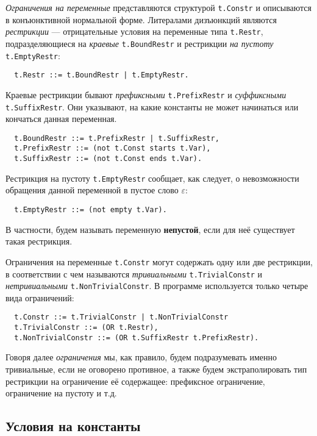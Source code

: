 \documentclass[12pt]{article}
\begin{document}
\textit{Ограничения на переменные} представляются структурой \texttt{t.Constr}
и описываются в конъюнктивной нормальной форме. Литералами дизъюнкций являются
\textit{рестрикции} --- отрицательные условия на переменные типа
\texttt{t.Restr}, подразделяющиеся на \textit{краевые} \texttt{t.BoundRestr} и
рестрикции \textit{на пустоту} \\ \texttt{t.EmptyRestr}:
\begin{Verbatim}
  t.Restr ::= t.BoundRestr | t.EmptyRestr.
\end{Verbatim}
Краевые рестрикции бывают \textit{префиксными} \texttt{t.PrefixRestr} и
\textit{суффиксными} \texttt{t.SuffixRestr}. Они указывают, на какие константы
не может начинаться или кончаться данная переменная.
\begin{Verbatim}
  t.BoundRestr ::= t.PrefixRestr | t.SuffixRestr,
  t.PrefixRestr ::= (not t.Const starts t.Var),
  t.SuffixRestr ::= (not t.Const ends t.Var).
\end{Verbatim}
Рестрикция на пустоту \texttt{t.EmptyRestr} сообщает, как следует, о
невозможности обращения данной переменной в пустое слово $\varepsilon$:
\begin{Verbatim}
  t.EmptyRestr ::= (not empty t.Var).
\end{Verbatim}
В частности, будем называть переменную \textbf{непустой}, если для неё
существует такая рестрикция.

Ограничения на переменные \texttt{t.Constr} могут содержать одну или две
рестрикции, в соответствии с чем называются \textit{тривиальными}
\texttt{t.TrivialConstr} и \textit{нетривиальными} \texttt{t.NonTrivialConstr}.
В программе используется только четыре вида ограничений:
\begin{Verbatim}
  t.Constr ::= t.TrivialConstr | t.NonTrivialConstr
  t.TrivialConstr ::= (OR t.Restr),
  t.NonTrivialConstr ::= (OR t.SuffixRestr t.PrefixRestr).
\end{Verbatim}
Говоря далее \textit{ограничения} мы, как правило, будем подразумевать именно
тривиальные, если не оговорено противное, а также будем экстраполировать
тип рестрикции на ограничение её содержащее: префиксное ограничение,
ограничение на пустоту и т.д.


\subsection{Условия на константы}
\end{document}

